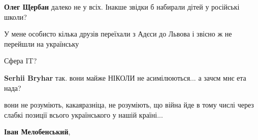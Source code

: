 \begin{itemize}
\begin{itemize}
 
\textbf{Олег Щербан} далеко не у всіх. Інакше звідки б набирали дітей у російські школи?
\end{itemize}

 

У мене особисто кілька друзів переїхали з Адєси до Львова і звісно ж не
перейшли на українську 🙁

\begin{itemize}
 
Сфера IT?

 
\textbf{Serhii Bryhar} так. вони майже НІКОЛИ не асимілюються... а зачєм мнє ета нада?

 
вони не розуміють, какаяразніца, не розуміють, що війна йде в тому числі через
слабкі позиції всього українського у нашій країні...

 
\textbf{Іван Мелобенський}, 


\end{itemize}
\end{itemize}
